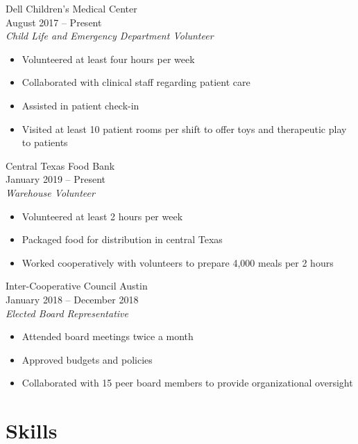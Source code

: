 \documentclass[]{article}
\providecommand{\tightlist}{%
  \setlength{\itemsep}{0pt}\setlength{\parskip}{0pt}}
\begin{document}
Dell Children's Medical Center\\
August 2017 -- Present\\
\emph{Child Life and Emergency Department Volunteer}

\begin{itemize}
\tightlist
\item
  Volunteered at least four hours per week\\
\item
  Collaborated with clinical staff regarding patient care\\
\item
  Assisted in patient check-in\\
\item
  Visited at least 10 patient rooms per shift to offer toys and
  therapeutic play to patients
\end{itemize}

Central Texas Food Bank\\
January 2019 -- Present\\
\emph{Warehouse Volunteer}

\begin{itemize}
\tightlist
\item
  Volunteered at least 2 hours per week\\
\item
  Packaged food for distribution in central Texas\\
\item
  Worked cooperatively with volunteers to prepare 4,000 meals per 2
  hours
\end{itemize}

Inter-Cooperative Council Austin\\
January 2018 -- December 2018\\
\emph{Elected Board Representative}

\begin{itemize}
\tightlist
\item
  Attended board meetings twice a month\\
\item
  Approved budgets and policies\\
\item
  Collaborated with 15 peer board members to provide organizational
  oversight
\end{itemize}

\section{Skills}\label{skills}
\end{document}
